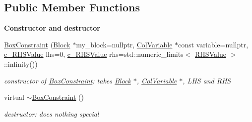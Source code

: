 \subsection*{Public Member Functions}
\begin{Indent}\textbf{ Constructor and destructor}\par
\begin{DoxyCompactItemize}
\item 
\mbox{\hyperlink{class_s_m_spp__di__unipi__it_1_1_box_constraint_ae033132828040ea2942dbbb91cd5e6ef}{Box\+Constraint}} (\mbox{\hyperlink{class_s_m_spp__di__unipi__it_1_1_block}{Block}} $\ast$my\+\_\+block=nullptr, \mbox{\hyperlink{class_s_m_spp__di__unipi__it_1_1_col_variable}{Col\+Variable}} $\ast$const variable=nullptr, \mbox{\hyperlink{class_s_m_spp__di__unipi__it_1_1_row_constraint_a34abd4b01d3a2024be5f6d13dd88779f}{c\+\_\+\+R\+H\+S\+Value}} lhs=0, \mbox{\hyperlink{class_s_m_spp__di__unipi__it_1_1_row_constraint_a34abd4b01d3a2024be5f6d13dd88779f}{c\+\_\+\+R\+H\+S\+Value}} rhs=std\+::numeric\+\_\+limits$<$ \mbox{\hyperlink{class_s_m_spp__di__unipi__it_1_1_row_constraint_a8813536ab3b13a81c8e83a999ade3bd8}{R\+H\+S\+Value}} $>$\+::infinity())
\begin{DoxyCompactList}\small\item\em constructor of \mbox{\hyperlink{class_s_m_spp__di__unipi__it_1_1_box_constraint}{Box\+Constraint}}\+: takes \mbox{\hyperlink{class_s_m_spp__di__unipi__it_1_1_block}{Block}} $\ast$, \mbox{\hyperlink{class_s_m_spp__di__unipi__it_1_1_col_variable}{Col\+Variable}} $\ast$, L\+HS and R\+HS \end{DoxyCompactList}\item 
\mbox{\label{class_s_m_spp__di__unipi__it_1_1_box_constraint_acf2f522aa96ef7b3a9a662a5b99ba5b9}} 
virtual \mbox{\hyperlink{class_s_m_spp__di__unipi__it_1_1_box_constraint_acf2f522aa96ef7b3a9a662a5b99ba5b9}{$\sim$\+Box\+Constraint}} ()
\begin{DoxyCompactList}\small\item\em destructor\+: does nothing special \end{DoxyCompactList}\end{DoxyCompactItemize}
\end{Indent}
